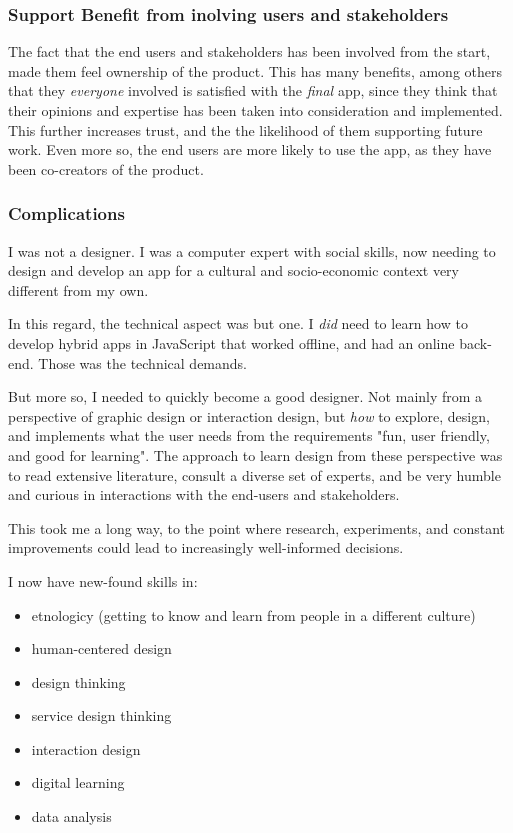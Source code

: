 \subsubsection{Support Benefit from inolving users and stakeholders}
The fact that the end users and stakeholders has been involved from the start, made them feel ownership of the product. This has many benefits, among others that they \textit{everyone} involved is satisfied with the \textit{final} app, since they think that their opinions and expertise has been taken into consideration and implemented. This further increases trust, and the the likelihood of them supporting future work. Even more so, the end users are more likely to use the app, as they have been co-creators of the product.

\subsubsection{Complications}
I was not a designer. I was a computer expert with social skills, now needing to design and develop an app for a cultural and socio-economic context very different from my own.

In this regard, the technical aspect was but one. I \textit{did} need to learn how to develop hybrid apps in JavaScript that worked offline, and had an online back-end. Those was the technical demands.

But more so, I needed to quickly become a good designer. Not mainly from a perspective of graphic design or interaction design, but \textit{how} to explore, design, and implements what the user needs from the requirements "fun, user friendly, and good for learning". The approach to learn design from these perspective was to read extensive literature, consult a diverse set of experts, and be very humble and curious in interactions with the end-users and stakeholders.

This took me a long way, to the point where research, experiments, and constant improvements could lead to increasingly well-informed decisions.

I now have new-found skills in:
\begin{itemize}
\item etnologicy (getting to know and learn from people in a different culture)
\item human-centered design
\item design thinking
\item service design thinking
\item interaction design
\item digital learning
\item data analysis
\end{itemize}

